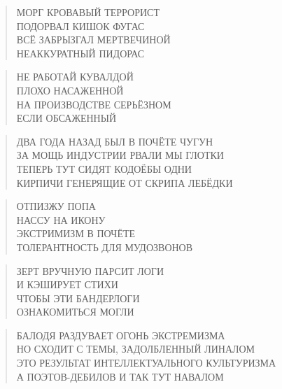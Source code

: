 \poemtitle{***}
\begin{verse}
МОРГ КРОВАВЫЙ ТЕРРОРИСТ\\
ПОДОРВАЛ КИШОК ФУГАС\\
ВСЁ ЗАБРЫЗГАЛ МЕРТВЕЧИНОЙ\\
НЕАККУРАТНЫЙ ПИДОРАС
\end{verse}

\poemtitle{***}
\begin{verse}
НЕ РАБОТАЙ КУВАЛДОЙ\\
ПЛОХО НАСАЖЕННОЙ\\
НА ПРОИЗВОДСТВЕ СЕРЬЁЗНОМ\\
ЕСЛИ ОБСАЖЕННЫЙ
\end{verse}

\poemtitle{***}
\begin{verse}
ДВА ГОДА НАЗАД БЫЛ В ПОЧЁТЕ ЧУГУН\\
ЗА МОЩЬ ИНДУСТРИИ РВАЛИ МЫ ГЛОТКИ\\
ТЕПЕРЬ ТУТ СИДЯТ КОДОЁБЫ ОДНИ\\
 КИРПИЧИ ГЕНЕРЯЩИЕ  ОТ СКРИПА ЛЕБЁДКИ
\end{verse}

\poemtitle{***}
\begin{verse}
ОТПИЗЖУ ПОПА\\
НАССУ НА ИКОНУ\\
ЭКСТРИМИЗМ В ПОЧЁТЕ\\
ТОЛЕРАНТНОСТЬ ДЛЯ МУДОЗВОНОВ
\end{verse}

\poemtitle{***}
\begin{verse}
ЗЕРТ ВРУЧНУЮ ПАРСИТ ЛОГИ\\
И КЭШИРУЕТ СТИХИ\\
ЧТОБЫ ЭТИ БАНДЕРЛОГИ\\
ОЗНАКОМИТЬСЯ МОГЛИ
\end{verse}

\poemtitle{***}
\begin{verse}
БАЛОДЯ РАЗДУВАЕТ ОГОНЬ ЭКСТРЕМИЗМА\\
НО СХОДИТ С ТЕМЫ, ЗАДОЛБЛЕННЫЙ ЛИНАЛОМ\\
ЭТО РЕЗУЛЬТАТ ИНТЕЛЛЕКТУАЛЬНОГО КУЛЬТУРИЗМА\\
А ПОЭТОВ-ДЕБИЛОВ И ТАК ТУТ НАВАЛОМ
\end{verse}

